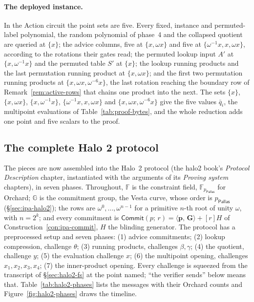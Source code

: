 \documentclass[11pt,a4paper]{article}
\theoremstyle{definition}
\newcommand{\F}{\mathbb{F}}
\newcommand{\G}{\mathbb{G}}
\newcommand{\ip}[2]{\langle #1,\, #2 \rangle}
\newcommand{\Comm}{\mathsf{Commit}}
\newcommand{\Pallas}{\ensuremath{\mathsf{Pallas}}}
\begin{document}
\paragraph{The deployed instance.}
In the Action circuit the point sets are five. Every fixed, instance and
permuted-label polynomial, the random polynomial of phase~4 and the
collapsed quotient are queried at $\{x\}$; the advice columns, five at
$\{x, \omega x\}$ and five at $\{\omega^{-1}x, x, \omega x\}$, according
to the rotations their gates read; the permuted lookup input $A'$ at
$\{x, \omega^{-1}x\}$ and the permuted table $S'$ at $\{x\}$; the lookup
running products and the last permutation running product at
$\{x, \omega x\}$; and the first two permutation running products at
$\{x, \omega x, \omega^{-6}x\}$, the last rotation reaching the boundary
row of Remark~\ref{rem:active-rows} that chains one product into the
next. The sets $\{x\}$, $\{x, \omega x\}$, $\{x, \omega^{-1}x\}$,
$\{\omega^{-1}x, x, \omega x\}$ and $\{x, \omega x, \omega^{-6}x\}$ give
the five values $\bar q_i$, the multipoint evaluations of
Table~\ref{tab:proof-bytes}, and the whole reduction adds one point and
five scalars to the proof.

\subsection{The complete Halo 2 protocol}
\label{sec:halo2-protocol}

The pieces are now assembled into the Halo~2 protocol (the halo2 book's
\emph{Protocol Description} chapter, instantiated with the arguments of
its \emph{Proving system} chapters), in seven phases. Throughout, $\F$ is the
constraint field, $\F_{p_{\Pallas}}$ for Orchard; $\G$ is the commitment
group, the Vesta curve, whose order is $p_{\Pallas}$
(\S\ref{sec:ipa-halo2}); the rows are $\omega^{0}, \dots, \omega^{n-1}$
for a primitive $n$-th root of unity $\omega$, with $n = 2^{k}$; and every
commitment is $\Comm(p;\, r) = \ip{\mathbf p}{\mathbf G} + [r]H$ of
Construction~\ref{con:ipa-commit}, $H$ the blinding generator. The
protocol has a preprocessed setup and seven phases: (1) advice
commitments; (2) lookup compression, challenge $\theta$; (3) running
products, challenges $\beta, \gamma$; (4) the quotient, challenge $y$;
(5) the evaluation challenge $x$; (6) the multipoint opening, challenges
$x_1, x_2, x_3, x_4$; (7) the inner-product opening. Every challenge is
squeezed from the transcript of \S\ref{sec:halo2-fs} at the point named;
``the verifier sends'' below means that. Table~\ref{tab:halo2-phases}
lists the messages with their Orchard counts and
Figure~\ref{fig:halo2-phases} draws the timeline.
\end{document}

